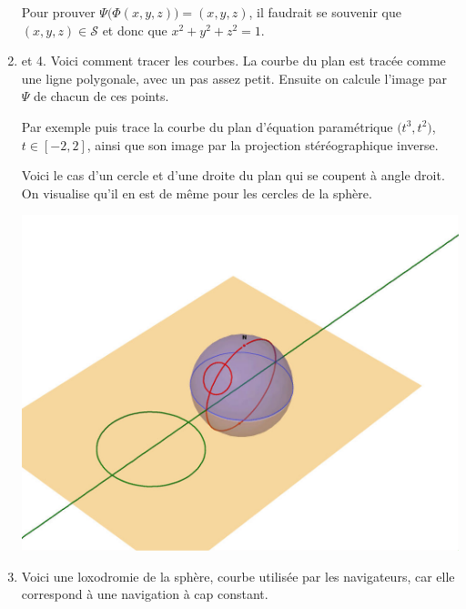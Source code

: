\documentclass[class=report,crop=false]{standalone}
\begin{document}
\begin{enumerate}
  Pour prouver $\Psi\big( \Phi(x,y,z) \big) = (x,y,z)$, il faudrait se souvenir
  que $(x,y,z) \in \mathcal{S}$ et donc que $x^2+y^2+z^2=1$.
 
  \item et 4. Voici comment tracer les courbes.
  La courbe du plan est tracée comme une ligne polygonale,
  avec un pas assez petit. Ensuite on calcule l'image par 
  $\Psi$ de chacun de ces points.
  
 
 Par exemple  puis  trace la courbe
 du plan d'équation paramétrique $\big(t^3,t^2\big)$, $t\in[-2,2]$, ainsi
 que son image par la projection stéréographique inverse.
 
 Voici le cas d'un cercle et d'une droite du plan qui se coupent à angle droit. On visualise qu'il en est 
 de même pour les cercles de la sphère.
 

\begin{center}
  \includegraphics[scale=0.3]{figures/stereo2.jpg} 
\end{center}

\setcounter{enumi}{4}
  \item Voici une loxodromie de la sphère, courbe utilisée par les navigateurs, car elle
  correspond à une navigation à cap constant.
  


\end{enumerate}
\end{document}
